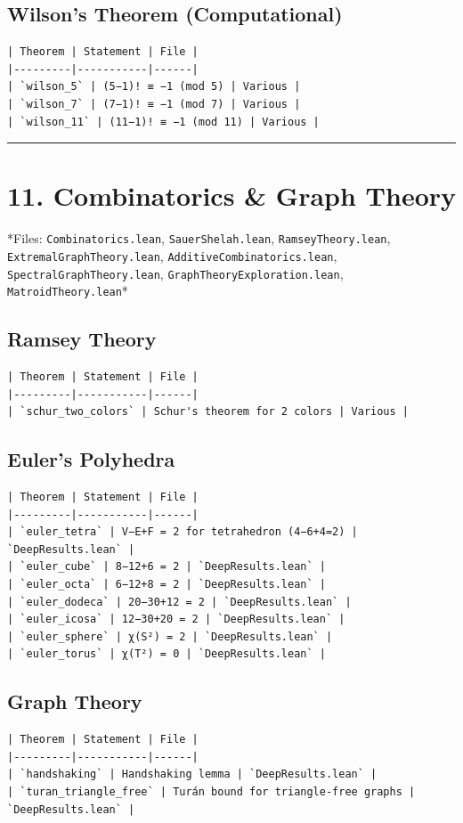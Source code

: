 \documentclass[12pt,a4paper,openany]{book}
\begin{document}
\subsection{Wilson's Theorem (Computational)}
\begin{verbatim}
| Theorem | Statement | File |
|---------|-----------|------|
| `wilson_5` | (5−1)! ≡ −1 (mod 5) | Various |
| `wilson_7` | (7−1)! ≡ −1 (mod 7) | Various |
| `wilson_11` | (11−1)! ≡ −1 (mod 11) | Various |
\end{verbatim}

\bigskip\hrule\bigskip

\section{11. Combinatorics \& Graph Theory}

*Files: \texttt{Combinatorics.lean}, \texttt{SauerShelah.lean}, \texttt{RamseyTheory.lean}, \texttt{ExtremalGraphTheory.lean}, \texttt{AdditiveCombinatorics.lean}, \texttt{SpectralGraphTheory.lean}, \texttt{GraphTheoryExploration.lean}, \texttt{MatroidTheory.lean}*

\subsection{Ramsey Theory}
\begin{verbatim}
| Theorem | Statement | File |
|---------|-----------|------|
| `schur_two_colors` | Schur's theorem for 2 colors | Various |
\end{verbatim}

\subsection{Euler's Polyhedra}
\begin{verbatim}
| Theorem | Statement | File |
|---------|-----------|------|
| `euler_tetra` | V−E+F = 2 for tetrahedron (4−6+4=2) | `DeepResults.lean` |
| `euler_cube` | 8−12+6 = 2 | `DeepResults.lean` |
| `euler_octa` | 6−12+8 = 2 | `DeepResults.lean` |
| `euler_dodeca` | 20−30+12 = 2 | `DeepResults.lean` |
| `euler_icosa` | 12−30+20 = 2 | `DeepResults.lean` |
| `euler_sphere` | χ(S²) = 2 | `DeepResults.lean` |
| `euler_torus` | χ(T²) = 0 | `DeepResults.lean` |
\end{verbatim}

\subsection{Graph Theory}
\begin{verbatim}
| Theorem | Statement | File |
|---------|-----------|------|
| `handshaking` | Handshaking lemma | `DeepResults.lean` |
| `turan_triangle_free` | Turán bound for triangle-free graphs | `DeepResults.lean` |
\end{verbatim}
\end{document}
